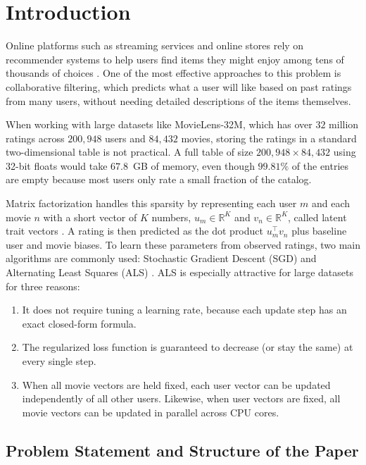 \documentclass{article}
\theoremstyle{plain}
\theoremstyle{definition}
\begin{document}
\section{Introduction}
\label{sec:introduction}

Online platforms such as streaming services and online stores rely on recommender systems to help users find items they might enjoy among tens of thousands of choices \cite{koren2009matrix,harper2015movielens}. One of the most effective approaches to this problem is collaborative filtering, which predicts what a user will like based on past ratings from many users, without needing detailed descriptions of the items themselves.

When working with large datasets like MovieLens-32M, which has over $32$ million ratings across $200{,}948$ users and $84{,}432$ movies, storing the ratings in a standard two-dimensional table is not practical. A full table of size $200{,}948 \times 84{,}432$ using 32-bit floats would take $67.8$~GB of memory, even though $99.81\%$ of the entries are empty because most users only rate a small fraction of the catalog.

Matrix factorization handles this sparsity by representing each user $m$ and each movie $n$ with a short vector of $K$ numbers, $u_m \in \mathbb{R}^K$ and $v_n \in \mathbb{R}^K$, called latent trait vectors \cite{mnih2007probabilistic,koren2009matrix}. A rating is then predicted as the dot product $u_m^\top v_n$ plus baseline user and movie biases. To learn these parameters from observed ratings, two main algorithms are commonly used: Stochastic Gradient Descent (SGD) and Alternating Least Squares (ALS) \cite{zhou2008large}. ALS is especially attractive for large datasets for three reasons:
\begin{enumerate}
    \item It does not require tuning a learning rate, because each update step has an exact closed-form formula.
    \item The regularized loss function is guaranteed to decrease (or stay the same) at every single step.
    \item When all movie vectors are held fixed, each user vector can be updated independently of all other users. Likewise, when user vectors are fixed, all movie vectors can be updated in parallel across CPU cores.
\end{enumerate}

\subsection{Problem Statement and Structure of the Paper}
\end{document}
